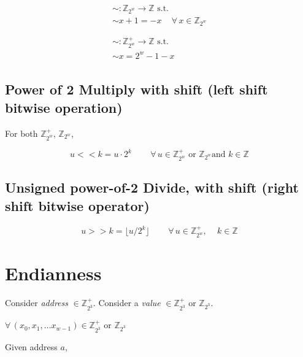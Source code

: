 \documentclass[10pt]{amsart}
\begin{document}
\begin{equation}
\begin{gathered}
\begin{gathered} 
\sim : \mathbb{Z}_{2^w} \to \mathbb{Z} \text{ s.t. } \\
\sim x + 1 = -x \quad \, \forall \, x \in \mathbb{Z}_{2^w} \\
\end{gathered}  \\
\begin{gathered} 
\sim : \mathbb{Z}^+_{2^w} \to \mathbb{Z} \text{ s.t. } \\
\sim x = 2^w- 1 -x 
\end{gathered}
\end{gathered}
\end{equation}

\subsection{Power of 2 Multiply with shift (left shift bitwise operation) }

For both $\mathbb{Z}^+_{2^w}$, $\mathbb{Z}_{2^w}$, 

\begin{equation}
u << k = u \cdot 2^k \qquad \, \forall \, u \in \mathbb{Z}^+_{2^w} \text{ or } \mathbb{Z}_{2^w} \text{and } k \in \mathbb{Z}
\end{equation}

\subsection{Unsigned power-of-2 Divide, with shift (right shift bitwise operator)}

\begin{equation}
u >> k = \lfloor u / 2^k \rfloor \qquad \, \forall \, u \in \mathbb{Z}^+_{2^w}, \quad \, k \in \mathbb{Z}  
\end{equation}

\section{Endianness} 

Consider \emph{address} $\in \mathbb{Z}^+_{2^3}$.  Consider a \emph{value} $\in \mathbb{Z}^+_{2^3}$ or $\mathbb{Z}_{2^3}$. 

$\forall \, (x_0, x_1, \dots x_{w-1}) \in \mathbb{Z}^+_{2^3} \text{ or } \mathbb{Z}_{2^3}$

Given address $a$, 
\end{document}
